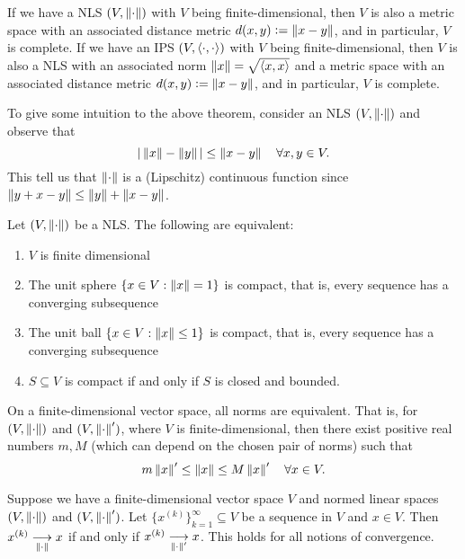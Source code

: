 \begin{theorem}
\label{thm:induced-banach-and-hilbert-spaces}
If we have a NLS $(V, \left\lVert\cdot\right\rVert)$ with $V$ being finite-dimensional, then $V$ is also a metric space with an associated distance metric $d(x,y) \vcentcolon= \left\lVert x-y\right\rVert$, and in particular, $V$ is complete.
If we have an IPS $(V, \langle \cdot, \cdot\rangle)$ with $V$ being finite-dimensional, then $V$ is also a NLS with an associated norm $\left\lVert x\right\rVert = \sqrt{\langle x, x\rangle}$ and a metric space with an associated distance metric $d(x,y) \vcentcolon= \left\lVert x-y\right\rVert$, and in particular, $V$ is complete.
\end{theorem}

To give some intuition to the above theorem, consider an NLS $(V, \left\lVert\cdot\right\rVert)$ and observe that 
$$
|\left\lVert x\right\rVert - \left\lVert y\right\rVert| \leq \left\lVert x-y\right\rVert \quad \forall x,y \in V.
$$
This tell us that $\left\lVert\cdot\right\rVert$ is a (Lipschitz) continuous function since $\left\lVert y+x-y\right\rVert \leq \left\lVert y\right\rVert + \left\lVert x-y\right\rVert$.

\begin{theorem}
\label{thm:nls-fin-dim-equivalencies}
Let $(V, \left\lVert\cdot\right\rVert)$ be a NLS. The following are equivalent:
\begin{enumerate}[label=(\arabic*)]
    \item $V$ is finite dimensional
    \item The unit sphere $\{x \in V : \left\lVert x\right\rVert = 1\}$ is compact, that is, every sequence has a converging subsequence
    \item The unit ball $\{x \in V: \left\lVert x\right\rVert \leq 1\}$ is compact, that is, every sequence has a converging subsequence
    \item $S \subseteq V$ is compact if and only if $S$ is closed and bounded.
\end{enumerate}
\end{theorem}

\begin{theorem}
\label{thm:equivalent-norms}
On a finite-dimensional vector space, all norms are equivalent. That is, for $(V, \left\lVert\cdot\right\rVert)$ and $(V, \left\lVert\cdot\right\rVert')$, where $V$ is finite-dimensional, then there exist positive real numbers $m, M$ (which can depend on the chosen pair of norms) such that
$$
m \left\lVert x\right\rVert' \leq \left\lVert x\right\rVert \leq M \left\lVert x\right\rVert' \quad \forall x \in V.
$$
\end{theorem}

\begin{corollary}
\label{cor:equivalent-norms-convergence}
Suppose we have a finite-dimensional vector space $V$ and normed linear spaces $(V, \left\lVert\cdot\right\rVert)$ and $(V, \left\lVert\cdot\right\rVert')$. 
Let $\{x^{(k)}\}_{k=1}^\infty \subseteq V$ be a sequence in $V$ and $x \in V$. 
Then 
$x^{(k)} \underset{\left\lVert\cdot\right\rVert}{\longrightarrow} x$ 
if and only if 
$x^{(k)} \underset{\left\lVert\cdot\right\rVert'}{\longrightarrow} x$. This holds for all notions of convergence.
\end{corollary}


